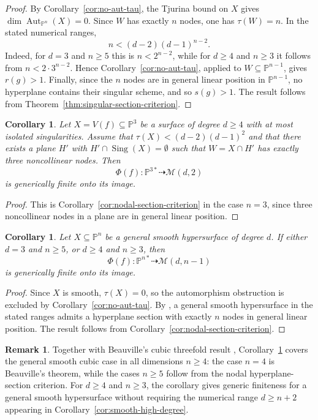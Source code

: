 \documentclass[11pt]{amsart}
\theoremstyle{plain}
\newtheorem{cor}[subsection]{Corollary}
\theoremstyle{definition}
\newtheorem{rk}[subsection]{Remark}
\numberwithin{equation}{section}
\newcommand{\M}{{\mathcal M}}
\newcommand{\PP}{\mathbb{P}}
\DeclareMathOperator{\Aut}{Aut}
\DeclareMathOperator{\Sing}{Sing}
\begin{document}
\begin{proof}
By Corollary~\ref{cor:no-aut-tau}, the Tjurina bound on $X$ gives
$\dim\Aut_{\PP^n}(X)=0$. Since $W$ has exactly $n$ nodes, one has $\tau(W)=n$.
In the stated numerical ranges,
\[
n<(d-2)(d-1)^{n-2}.
\]
Indeed, for $d=3$ and $n\geq5$ this is $n<2^{n-2}$, while for $d\geq4$ and
$n\geq3$ it follows from $n<2\cdot3^{n-2}$. Hence
Corollary~\ref{cor:no-aut-tau}, applied to $W\subseteq\PP^{n-1}$, gives
$r(g)>1$. Finally, since the $n$ nodes are in general linear position in
$\PP^{n-1}$, no hyperplane contains their singular scheme, and so $s(g)>1$.
The result follows from Theorem~\ref{thm:singular-section-criterion}.
\end{proof}
\begin{cor}
\label{cor:singular-surfaces-three-nodes}
Let $X=V(f)\subseteq\PP^3$ be a surface of degree $d\geq4$ with at most isolated
singularities. Assume that $\tau(X)<(d-2)(d-1)^2$ and that there exists a plane
$H'$ with $H'\cap\Sing(X)=\emptyset$ such that $W=X\cap H'$ has exactly three
noncollinear nodes. Then
\[
\Phi(f):\PP^{3*}\dashrightarrow \M(d,2)
\]
is generically finite onto its image.
\end{cor}
\begin{proof}
This is Corollary~\ref{cor:nodal-section-criterion} in the case $n=3$, since
three noncollinear nodes in a plane are in general linear position.
\end{proof}


\begin{cor}
\label{cor:general-smooth-hypersurfaces}
Let $X\subseteq\PP^n$ be a general smooth hypersurface of degree $d$. If either
$d=3$ and $n\geq5$, or $d\geq4$ and $n\geq3$, then
\[
\Phi(f):\PP^{n*}\dashrightarrow \M(d,n-1)
\]
is generically finite onto its image.
\end{cor}

\begin{proof}
Since $X$ is smooth, $\tau(X)=0$, so the automorphism obstruction is excluded by
Corollary~\ref{cor:no-aut-tau}. By \cite[Theorem 1.1]{DI0}, a general smooth hypersurface in
the stated ranges admits a hyperplane section with exactly $n$ nodes in general
linear position. The result follows from Corollary~\ref{cor:nodal-section-criterion}.
\end{proof}

\begin{rk}
\label{rk:general-smooth-comparison}
Together with Beauville's cubic threefold result \cite{B},
Corollary~\ref{cor:general-smooth-hypersurfaces} covers the general smooth
cubic case in all dimensions $n\geq4$: the case $n=4$ is Beauville's theorem,
while the cases $n\geq5$ follow from the nodal hyperplane-section criterion.
For $d\geq4$ and $n\geq3$, the corollary gives generic finiteness for a general
smooth hypersurface without requiring the numerical range $d\geq n+2$ appearing
in Corollary~\ref{cor:smooth-high-degree}.
\end{rk}
\end{document}
